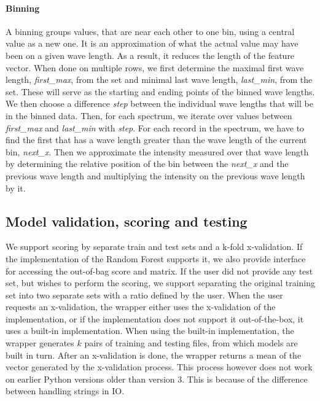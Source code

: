 \documentclass[thesis=B,english]{FITthesis}[2012/10/20]
\begin{document}
\paragraph*{Binning}
\label{sec:binning} 
A binning groups values, that are near each other to one bin, using a central value as a new one. It is an approximation of what the actual value may have been on a given wave length. As a result, it reduces the length of the feature vector. When done on multiple rows, we first determine the maximal first wave length, \textit{first\_max}, from the set and minimal last wave length, \textit{last\_min}, from the set. These will serve as the starting and ending points of the binned wave lengths. We then choose a difference \textit{step} between the individual wave lengths that will be in the binned data. Then, for each spectrum, we iterate over values between \textit{first\_max} and \textit{last\_min} with \textit{step}. For each record in the spectrum, we have to find the first that has a wave length greater than the wave length of the current bin, \textit{next\_x}. Then we approximate the intensity measured over that wave length by determining the relative position of the bin between the \textit{next\_x} and the previous wave length and multiplying the intensity on the previous wave length by it. 

\subsection{Model validation, scoring and testing}
\label{sub:wrapper_test}
We support scoring by separate train and test sets and a k-fold x-validation. If the implementation of the Random Forest supports it, we also provide interface for accessing the out-of-bag score and matrix. If the user did not provide any test set, but wishes to perform the scoring, we support separating the original training set into two separate sets with a ratio defined by the user. When the user requests an x-validation, the wrapper either uses the x-validation of the implementation, or if the implementation does not support it out-of-the-box, it uses a built-in implementation. When using the built-in implementation, the wrapper generates \(k\) pairs of training and testing files, from which models are built in turn. After an x-validation is done, the wrapper returns a mean of the vector generated by the x-validation process. This process however does not work on earlier Python versions older than version 3. This is because of the difference between handling strings in IO.  
\end{document}
